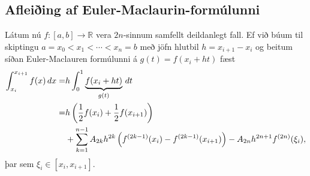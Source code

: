 \documentclass[letterpaper,10pt,icelandic]{sphinxmanual}
\begin{document}
\subsection{Afleiðing af Euler-Maclaurin-formúlunni}
\label{kafli05:afleiing-af-euler-maclaurin-formulunni}
Látum nú \(f : [a,b] \to \mathbb R\) vera \(2n\)-sinnum samfellt
deildanlegt fall. Ef við búum til skiptingu
\(a= x_0 < x_1 < \cdots <
x_n = b\) með jöfn hlutbil \(h = x_{i+1} - x_i\) og beitum síðan
Euler-Maclauren formúlunni á \(g(t) = f(x_i + ht)\) fæst
\begin{gather}
\begin{split}\begin{aligned}
\int_{x_i}^{x_{i+1}} f(x)\,dx
= & h\int_0^1 \underbrace{f(x_i + ht)}_{g(t)}\,dt \\
= & h \left( \frac{1}{2}f(x_i) + \frac{1}{2}f(x_{i+1})\right) \\
& +    \sum_{k=1}^{n-1}A_{2k}h^{2k}\left( f^{(2k-1)}(x_i) -
f^{(2k-1)}(x_{i+1}) \right) - A_{2n}h^{2n+1}f^{(2n)}(\xi_i), \end{aligned}\end{split}\notag
\end{gather}
þar sem \(\xi_i \in [x_i, x_{i+1}]\).
\end{document}
